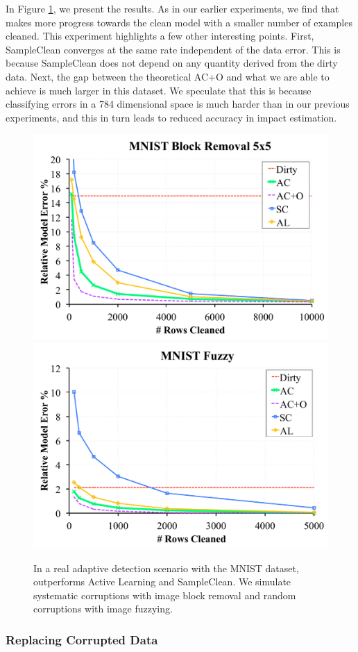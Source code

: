 \fi

In Figure \ref{mnist}, we present the results.
As in our earlier experiments, we find that \sys makes more progress towards the clean model with a smaller number of examples cleaned.
This experiment highlights a few other interesting points.
First, SampleClean converges at the same rate independent of the data error.
This is because SampleClean does not depend on any quantity derived from the dirty data.
Next, the gap between the theoretical AC+O and what we are able to achieve is much larger in this dataset.
We speculate that this is because classifying errors in a 784 dimensional space is much harder than in our previous experiments, and this in turn leads to reduced accuracy in impact estimation.

\begin{figure}[ht]
\centering
 \includegraphics[width=0.49\columnwidth]{exp/exp7a.pdf}
 \includegraphics[width=0.49\columnwidth]{exp/exp7b.pdf}
 \caption{In a real adaptive detection scenario with the MNIST dataset, \sys outperforms Active Learning and SampleClean. We simulate systematic corruptions with image block removal and random corruptions with image fuzzying.  \label{mnist}}
\end{figure}

\subsubsection{Replacing Corrupted Data}
